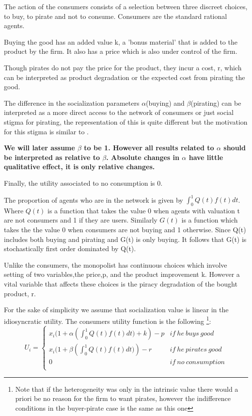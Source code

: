 \documentclass{article}
\begin{document}
The action of the consumers consists of a selection between three discreet choices, to buy, to pirate and not to consume. Consumers are the standard rational agents. 

Buying the good has an added value k, a 'bonus material' that is added to the product by the firm. It also has a price which is also under control of the firm. 

Though pirates do not pay the price for the product, they incur a cost, r, which can be interpreted as product degradation or the expected cost from pirating the good. 

The difference in the socialization parameters $\alpha$(buying) and $\beta$(pirating) can be interpreted as a more direct access to the network of consumers or just social stigma for pirating, the representation of this is quite different but the motivation for this stigma is similar to  \cite{CRP91}. 

\textbf{We will later assume $\beta$ to be 1. However all results related to $\alpha$ should be interpreted as relative to $\beta$. Absolute changes in $\alpha$ have little qualitative effect, it is only relative changes.}

Finally, the utility associated to no consumption is 0. 

The proportion of agents who are in the network is given by $ \int^{1}_{0}Q(t)f(t)dt $. Where $Q(t)$ is a function that takes the value 0 when agents with valuation t are not consumers and 1 if they are users. Similarly $G(t)$ is a function which takes the the value 0 when consumers are not buying and 1 otherwise. Since Q(t) includes both buying and pirating and G(t) is only buying. It follows that G(t) is stochastically first order dominated by Q(t). 

Unlike the consumers, the monopolist has continuous choices which involve setting of two variables,the price,p, and the product improvement k. However a vital variable that affects these choices is the piracy degradation of the bought product, r. 

For the sake of simplicity we assume that socialization value is linear in the idiosyncratic utility. The consumers utility function is the following \footnote{Note that if the heterogeneity was only in the intrinsic value there would a priori be no reason for the firm to want pirates, however the indifference conditions in the buyer-pirate case is the same as this one}:
\[
U_i= \left\{
                \begin{array}{ll}
                  x_i(1+\alpha \left(\int^{1}_{0}Q(t)f(t)dt) +k \right) -p  & if ~ he ~ buys ~ good  \\
                  x_i(1+\beta \left(\int^{1}_{0}Q(t)f(t)dt) \right) -r &  if ~ he ~ pirates ~ good \\
									0 & if ~ no ~ consumption  \\ 
                \end{array}
\right.
\]
\end{document}
